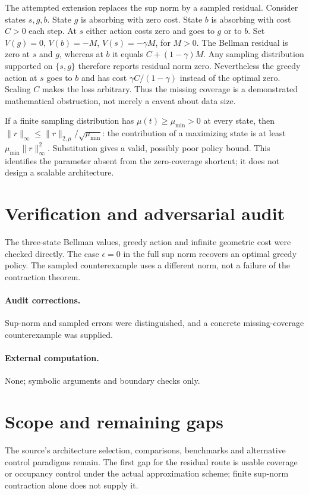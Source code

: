 \documentclass[11pt]{article}
\begin{document}
The attempted extension replaces the sup norm by a sampled residual. Consider
states $s,g,b$. State $g$ is absorbing with zero cost. State $b$ is absorbing
with cost $C>0$ each step. At $s$ either action costs zero and goes to $g$ or
to $b$. Set $V(g)=0$, $V(b)=-M$, $V(s)=-\gamma M$, for $M>0$.
The Bellman residual is zero at $s$ and $g$, whereas at $b$ it equals
$C+(1-\gamma)M$. Any sampling distribution supported on $\{s,g\}$ therefore
reports residual norm zero. Nevertheless the greedy action at $s$ goes to $b$
and has cost $\gamma C/(1-\gamma)$ instead of the optimal zero. Scaling $C$
makes the loss arbitrary. Thus the missing coverage is a demonstrated
mathematical obstruction, not merely a caveat about data size.

If a finite sampling distribution has $\mu(t)\ge\mu_{\min}>0$ at every state,
then $\|r\|_\infty\le\|r\|_{2,\mu}/\sqrt{\mu_{\min}}$: the contribution of
a maximizing state is at least $\mu_{\min}\|r\|_\infty^2$. Substitution gives
a valid, possibly poor policy bound. This identifies the parameter absent from
the zero-coverage shortcut; it does not design a scalable architecture.
\section{Verification and adversarial audit}
The three-state Bellman values, greedy action and infinite geometric cost
were checked directly. The case $\epsilon=0$ in the full sup norm recovers an
optimal greedy policy. The sampled counterexample uses a different norm, not a
failure of the contraction theorem.
\paragraph{Audit corrections.} Sup-norm and sampled errors were distinguished, and a concrete missing-coverage counterexample was supplied.
\paragraph{External computation.} None; symbolic arguments and boundary checks only.
\section{Scope and remaining gaps}
The source's architecture selection, comparisons, benchmarks and alternative
control paradigms remain. The first gap for the residual route is usable
coverage or occupancy control under the actual approximation scheme; finite
sup-norm contraction alone does not supply it.
\end{document}

